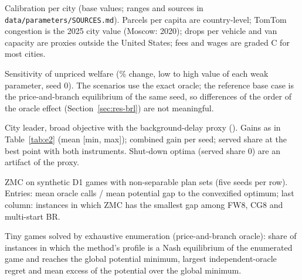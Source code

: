 \documentclass[preprint,12pt]{elsarticle}
\theoremstyle{definition}
\theoremstyle{remark}
\begin{document}
\begin{table}[h]\centering\small
\caption{Calibration per city (base values; ranges and sources in \texttt{data/parameters/SOURCES.md}). Parcels per capita are country-level; TomTom congestion is the 2025 city value (Moscow: 2020); drops per vehicle and van capacity are proxies outside the United States; fees and wages are graded C for most cities.}\label{tab:params}
\end{table}

\begin{table}[h]\centering\small
\caption{Sensitivity of unpriced welfare (\% change, low to high value of each weak parameter, seed 0). The scenarios use the exact oracle; the reference base case is the price-and-branch equilibrium of the same seed, so differences of the order of the oracle effect (Section~\ref{sec:res-brl}) are not meaningful.}\label{tab:sens}
\end{table}

\begin{table}[h]\centering\small
\caption{City leader, broad objective with the background-delay proxy (\EtwoSeeds). Gains as in Table~\ref{tab:e2} (mean [min, max]); combined gain per seed; served share at the best point with both instruments. Shut-down optima (served share 0) are an artifact of the proxy.}\label{tab:e2broad}
\end{table}



\begin{table}[h]\centering\small
\caption{ZMC on synthetic D1 games with non-separable plan sets (five seeds per row). Entries: mean oracle calls / mean potential gap to the convexified optimum; last column: instances in which ZMC has the smallest gap among FW8, CG8 and multi-start BR.}\label{tab:zmc-synth}
\end{table}

\begin{table}[h]\centering\small
\caption{Tiny games solved by exhaustive enumeration (price-and-branch oracle): share of instances in which the method's profile is a Nash equilibrium of the enumerated game and reaches the global potential minimum, largest independent-oracle regret and mean excess of the potential over the global minimum.}\label{tab:tiny}
\end{table}
\end{document}
